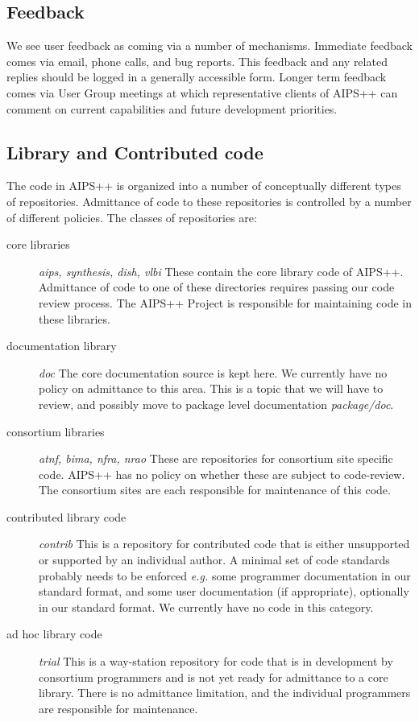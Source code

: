 \subsection{Feedback}

We see user feedback as coming via a number of mechanisms. Immediate
feedback comes via email, phone calls, and bug reports. This feedback
and any related replies should be logged in a generally accessible
form. Longer term feedback comes via User Group meetings at which
representative clients of AIPS++ can comment on current capabilities
and future development priorities.

\subsection{Library and Contributed code}

The code in AIPS++ is organized into a number of conceptually
different types of repositories. Admittance of code to these repositories
is controlled by a number of different policies. The classes of
repositories are:

\begin{description}
\item[core libraries] {\em aips, synthesis, dish, vlbi} These contain the core
library code of AIPS++. Admittance of code to one of these directories requires
passing our code review process. The AIPS++ Project is responsible for maintaining code
in these libraries.
\item[documentation library] {\em doc} The core documentation source is kept here.
We currently have no policy on admittance to this area. This is a topic that
we will  have to review, and possibly move to package level documentation
{\em package/doc}.
\item[consortium libraries] {\em atnf, bima, nfra, nrao} These are repositories for
consortium site specific code. AIPS++ has no policy on whether these are subject to
code-review. The consortium sites are each responsible for maintenance of this
code.
\item[contributed library code] {\em contrib} This is a repository for contributed
code that is either unsupported or supported by an individual author. A minimal
set of code standards probably needs to be enforced {\em e.g.} some programmer
documentation in our standard format, and some user documentation (if appropriate),
optionally in our standard format. We currently have no code in this category.
\item[ad hoc library code] {\em trial} This is a way-station repository for code that
is in development by consortium programmers and is not yet ready for
admittance to a core library. There is no admittance limitation, and
the individual programmers are responsible for maintenance.
\end{description}

